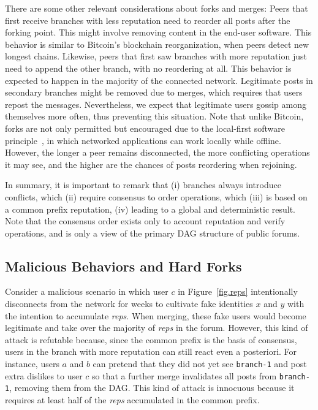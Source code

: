\documentclass[12pt]{article}
\newcommand{\reps}     {\emph{reps}\xspace}
\newcommand{\code}[1]  {\texttt{\footnotesize{#1}}}
\begin{document}
There are some other relevant considerations about forks and merges:
%
Peers that first receive branches with less reputation need to reorder all
posts after the forking point.
This might involve removing content in the end-user software.
This behavior is similar to Bitcoin's blockchain reorganization, when peers
detect new longest chains. %
%
Likewise, peers that first saw branches with more reputation just need to
append the other branch, with no reordering at all.
This behavior is expected to happen in the majority of the connected network.
%
Legitimate posts in secondary branches might be removed due to merges, which
requires that users repost the messages.
Nevertheless, we expect that legitimate users gossip among themselves more
often, thus preventing this situation.
%
Note that unlike Bitcoin, forks are not only permitted but encouraged due to
the local-first software principle~\cite{p2p.local}, in which networked
applications can work locally while offline.
However, the longer a peer remains disconnected, the more conflicting
operations it may see, and the higher are the chances of posts reordering when
rejoining.

In summary, it is important to remark that
    (i) branches always introduce conflicts, which
    (ii) require consensus to order operations, which
    (iii) is based on a common prefix reputation,
    (iv) leading to a global and deterministic result.
%
Note that the consensus order exists only to account reputation and verify
operations, and is only a view of the primary DAG structure of public forums.

\subsection{Malicious Behaviors and Hard Forks}
\label{sec.design.hard}

Consider a malicious scenario in which user $c$ in Figure~\ref{fig.reps}
intentionally disconnects from the network for weeks to cultivate fake
identities $x$ and $y$ with the intention to accumulate \reps.
When merging, these fake users would become legitimate and take over the
majority of \reps in the forum.
%
However, this kind of attack is refutable because, since the common prefix is
the basis of consensus, users in the branch with more reputation can still
react even a posteriori.
For instance, users $a$ and $b$ can pretend that they did not yet see
\code{branch-1} and post extra dislikes to user $c$ so that a further merge
invalidates all posts from \code{branch-1}, removing them from the DAG.
%
This kind of attack is innocuous because it requires at least half of the \reps
accumulated in the common prefix.
%
\end{document}
